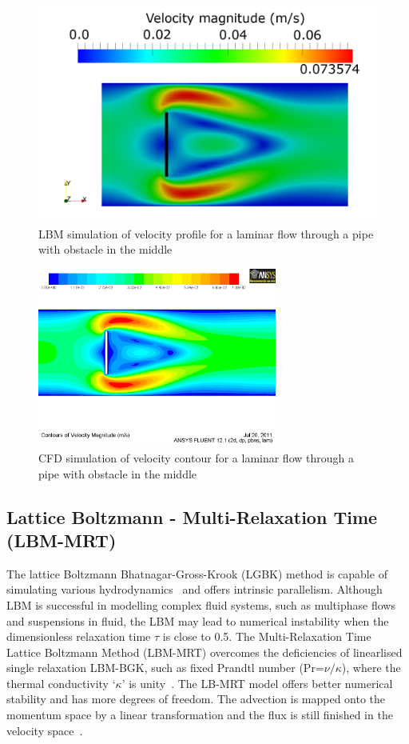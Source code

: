 \begin{figure}[htbp]
\centering
\hspace{-5mm}\includegraphics[width=\textwidth]{Chapter3/figures/lbm/LBM_Obstacle.png}
\caption{LBM simulation of velocity profile for a laminar flow through a pipe with obstacle in the middle}
\label{fig:Obstacle}
\end{figure}

\begin{figure}[htbp]
\centering
\includegraphics[width=0.7\textwidth]{Chapter3/figures/lbm/CFD_Obstacle.png}
\caption{CFD simulation of velocity contour for a laminar flow through a pipe with obstacle in the middle}
\label{fig:obsvc}
\end{figure}

\subsection{Lattice Boltzmann - Multi-Relaxation Time (LBM-MRT)}
The lattice Boltzmann Bhatnagar-Gross-Krook (LGBK) method is capable of simulating various hydrodynamics~\citep{Succi1989, Succi2001} and offers intrinsic parallelism. Although LBM is successful in modelling complex fluid systems, such as multiphase flows and suspensions in fluid, the LBM may lead to numerical instability when the dimensionless relaxation time $\tau$ is close to 0.5. The Multi-Relaxation Time Lattice Boltzmann Method (LBM-MRT) overcomes the deficiencies of linearlised single relaxation LBM-BGK, such as fixed Prandtl number (Pr=$\nu/\kappa$), where the thermal conductivity `$\kappa$' is unity~\citep{Liu2003a}. The LB-MRT model offers better numerical stability and has more degrees of freedom. The advection is mapped onto the momentum space by a linear transformation and the flux is still finished in the velocity space~\citep{Du2006}.

